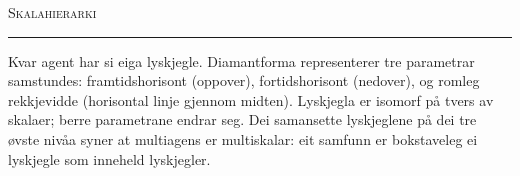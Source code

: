 \documentclass[a4paper,10pt]{article}
\begin{document}
\begin{center}
{\Large\scshape Skalahierarki}\hspace{0.6em}{\itshape Kognitive lyskjegler frå kvark til sivilisasjon}
\end{center}

\vspace{-0.4em}

\begin{center}
\rule{\textwidth}{0.3pt}
\end{center}

\vspace{0.1em}

{\small Kvar agent har si eiga lyskjegle. Diamantforma representerer tre parametrar samstundes: framtidshorisont (oppover), fortidshorisont (nedover), og romleg rekkjevidde (horisontal linje gjennom midten). Lyskjegla er isomorf på tvers av skalaer; berre parametrane endrar seg. Dei samansette lyskjeglene på dei tre øvste nivåa syner at multiagens er multiskalar: eit samfunn er bokstaveleg ei lyskjegle som inneheld lyskjegler.}

\vspace{0.1em}
\end{document}
